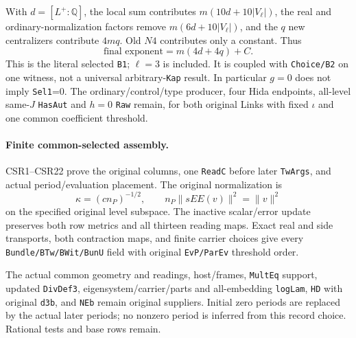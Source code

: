 With $d=[L^+:\mathbb Q]$, the local sum contributes
$m(10d+10|V_\ell|)$, the real and ordinary-normalization
factors remove $m(6d+10|V_\ell|)$, and the $q$ new centralizers
contribute $4mq$. Old $N4$ contributes only a constant. Thus
\[
                  \text{final exponent}=m(4d+4q)+C.
\]
This is the literal selected \texttt{B1}; $\ell=3$ is included.
It is coupled with \texttt{Choice/B2} on one witness, not a
universal arbitrary-\texttt{Kap} result. In particular $g=0$
does not imply \texttt{Sel1}=0. The ordinary/control/type
producer, four Hida endpoints, all-level same-$J$ \texttt{HasAut}
and $h=0$ \texttt{Raw} remain, for both original Links with
fixed $\iota$ and one common coefficient threshold.

\paragraph{Finite common-selected assembly.}
CSR1--CSR22 prove the original columns, one \texttt{ReadC}
before later \texttt{TwArgs}, and actual period/evaluation
placement. The original normalization is
\[
 \kappa=(c n_P)^{-1/2},\qquad n_P\|sEE(v)\|^2=\|v\|^2
\]
on the specified original level subspace.
The inactive scalar/error update preserves both row metrics
and all thirteen reading maps. Exact real and side transports,
both contraction maps, and finite carrier choices give every
\texttt{Bundle/BTw/BWit/BunU} field with original
\texttt{EvP/ParEv} threshold order.

The actual common geometry and readings, host/frames,
\texttt{MultEq} support, updated \texttt{DivDef3},
eigensystem/carrier/parts and all-embedding \texttt{logLam},
\texttt{HD} with original \texttt{d3b}, and \texttt{NEb}
remain original suppliers. Initial zero periods are replaced
by the actual later periods; no nonzero period is inferred
from this record choice. Rational tests and base rows remain.


